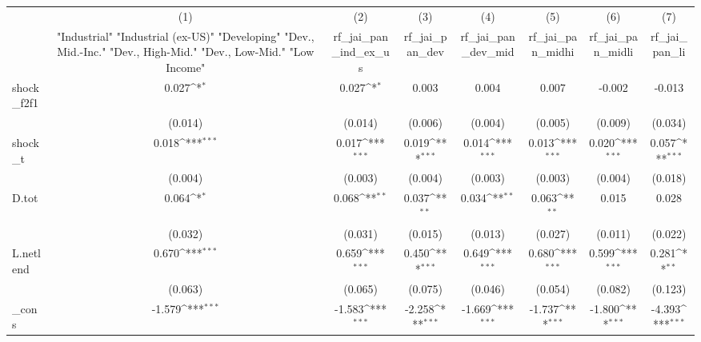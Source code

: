 {
\def\sym#1{\ifmmode^{#1}\else\(^{#1}\)\fi}
\begin{tabular}{l*{7}{c}}
\toprule
            &\multicolumn{1}{c}{(1)}&\multicolumn{1}{c}{(2)}&\multicolumn{1}{c}{(3)}&\multicolumn{1}{c}{(4)}&\multicolumn{1}{c}{(5)}&\multicolumn{1}{c}{(6)}&\multicolumn{1}{c}{(7)}\\
            &\multicolumn{1}{c}{ "Industrial" "Industrial (ex-US)" "Developing" "Dev., Mid.-Inc." "Dev., High-Mid."  "Dev., Low-Mid." "Low Income" }&\multicolumn{1}{c}{rf\_jai\_pan\_ind\_ex\_us}&\multicolumn{1}{c}{rf\_jai\_pan\_dev}&\multicolumn{1}{c}{rf\_jai\_pan\_dev\_mid}&\multicolumn{1}{c}{rf\_jai\_pan\_midhi}&\multicolumn{1}{c}{rf\_jai\_pan\_midli}&\multicolumn{1}{c}{rf\_jai\_pan\_li}\\
\midrule
shock\_f2f1  &       0.027\sym{*}  &       0.027\sym{*}  &       0.003         &       0.004         &       0.007         &      -0.002         &      -0.013         \\
            &     (0.014)         &     (0.014)         &     (0.006)         &     (0.004)         &     (0.005)         &     (0.009)         &     (0.034)         \\
\addlinespace
shock\_t     &       0.018\sym{***}&       0.017\sym{***}&       0.019\sym{***}&       0.014\sym{***}&       0.013\sym{***}&       0.020\sym{***}&       0.057\sym{***}\\
            &     (0.004)         &     (0.003)         &     (0.004)         &     (0.003)         &     (0.003)         &     (0.004)         &     (0.018)         \\
\addlinespace
D.tot       &       0.064\sym{*}  &       0.068\sym{**} &       0.037\sym{**} &       0.034\sym{**} &       0.063\sym{**} &       0.015         &       0.028         \\
            &     (0.032)         &     (0.031)         &     (0.015)         &     (0.013)         &     (0.027)         &     (0.011)         &     (0.022)         \\
\addlinespace
L.netlend   &       0.670\sym{***}&       0.659\sym{***}&       0.450\sym{***}&       0.649\sym{***}&       0.680\sym{***}&       0.599\sym{***}&       0.281\sym{**} \\
            &     (0.063)         &     (0.065)         &     (0.075)         &     (0.046)         &     (0.054)         &     (0.082)         &     (0.123)         \\
\addlinespace
\_cons      &      -1.579\sym{***}&      -1.583\sym{***}&      -2.258\sym{***}&      -1.669\sym{***}&      -1.737\sym{***}&      -1.800\sym{***}&      -4.393\sym{***}\\

\end{tabular}}
